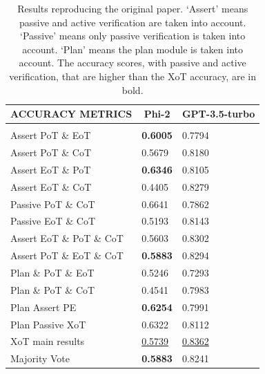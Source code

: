\documentclass[10pt]{article} %
\begin{document}
\begin{table}[t]
  \caption{Results reproducing the original paper. `Assert' means passive and active verification are taken into account. `Passive' means only passive verification is taken into account. `Plan' means the plan module is taken into account. The accuracy scores, with passive and active verification, that are higher than the XoT accuracy, are in bold.}
  \label{original-results}
  \begin{center}
  \begin{tabular}{lll}
  \multicolumn{1}{c}{\bf ACCURACY METRICS}  &\multicolumn{1}{c}{\bf Phi-2}  &\multicolumn{1}{c}{\bf GPT-3.5-turbo}
  \\ \hline \\
  Assert PoT \& EoT                         &\textbf{0.6005}                &0.7794\\
  Assert PoT \& CoT                         &0.5679                         &0.8180\\
  Assert EoT \& PoT                         &\textbf{0.6346}                &0.8105\\
  Assert EoT \& CoT                         &0.4405                         &0.8279\\
  Passive PoT \& CoT                        &0.6641                         &0.7862\\
  Passive EoT \& CoT                        &0.5193                         &0.8143\\
  Assert EoT \& PoT \& CoT                  &0.5603                         &0.8302\\
  Assert PoT \& EoT \& CoT                  &\textbf{0.5883}                &0.8294\\
  Plan \& PoT \& EoT                        &0.5246                         &0.7293\\
  Plan \& PoT \& CoT                        &0.4541                         &0.7983\\
  Plan Assert PE                            &\textbf{0.6254}                &0.7991\\
  Plan Passive XoT                          &0.6322                         &0.8112\\
  XoT main results                          &\underline{0.5739}             &\underline{0.8362}\\
  Majority Vote                             &\textbf{0.5883}                &0.8241\\
  \end{tabular}
  \end{center}
  \end{table}
\end{document}
